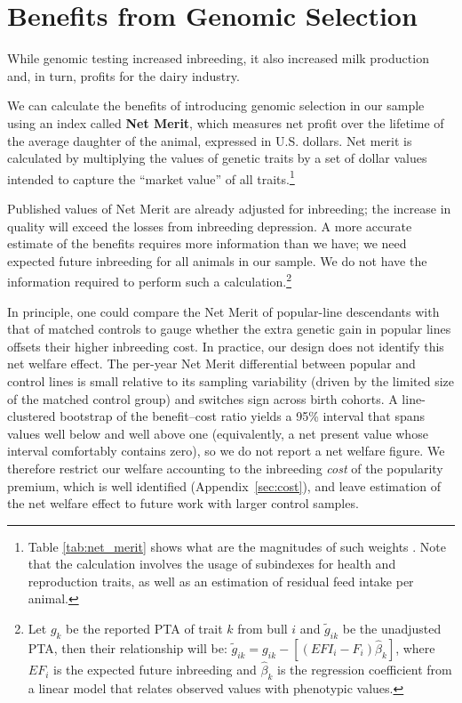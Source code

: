 \documentclass[12pt,letterpaper]{article}
\begin{document}
\section{Benefits from Genomic Selection\label{sec:benefit}} 
While genomic testing increased inbreeding, it also increased milk production and, in turn, profits for the dairy industry.

We can calculate the benefits of introducing genomic selection in our sample using an index called \textbf{Net Merit}, which measures net profit over the lifetime of the average daughter of the animal, expressed in U.S. dollars. Net merit is calculated by multiplying the values of genetic traits by a set of dollar values intended to capture the ``market value'' of all traits.\footnote{Table \ref{tab:net_merit} shows what are the magnitudes of such weights \citep{VanRaden2021}. Note that the calculation involves the usage of subindexes for health and reproduction traits, as well as an estimation of residual feed intake per animal.}

Published values of Net Merit are already adjusted for inbreeding; the increase in quality will exceed the losses from inbreeding depression. A more accurate estimate of the benefits requires more information than we have; we need expected future inbreeding for all animals in our sample. We do not have the information required to perform such a calculation.\footnote{Let $g_{k}$ be the reported PTA of trait $k$ from bull $i$ and $\tilde{g}_{ik}$ be the unadjusted PTA, then their relationship will be: $\tilde{g}_{ik}=g_{ik}-\left[(EFI_{i}-F_{i})\hat{\beta}_{k}\right]$, where $EF_{i}$ is the expected future inbreeding and $\hat{\beta}_{k}$ is the regression coefficient from a linear model that relates observed values with phenotypic values.} 

In principle, one could compare the Net Merit of popular-line descendants with that of matched controls to gauge whether the extra genetic gain in popular lines offsets their higher inbreeding cost. In practice, our design does not identify this net welfare effect. The per-year Net Merit differential between popular and control lines is small relative to its sampling variability (driven by the limited size of the matched control group) and switches sign across birth cohorts. A line-clustered bootstrap of the benefit--cost ratio yields a 95\% interval that spans values well below and well above one (equivalently, a net present value whose interval comfortably contains zero), so we do not report a net welfare figure. We therefore restrict our welfare accounting to the inbreeding \emph{cost} of the popularity premium, which is well identified (Appendix~\ref{sec:cost}), and leave estimation of the net welfare effect to future work with larger control samples.
\end{document}
